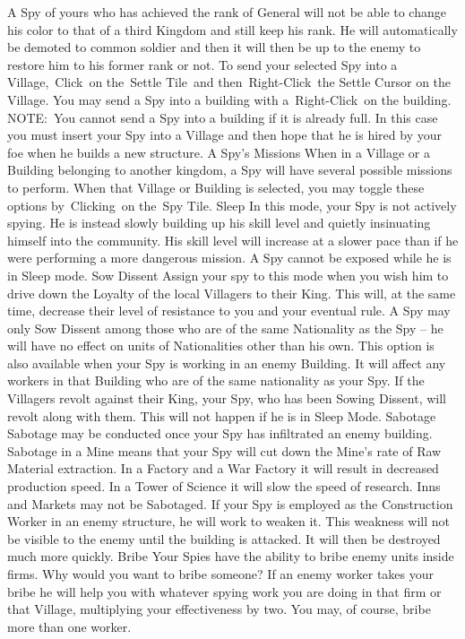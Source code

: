 A Spy of yours who has achieved the rank of General will not be able to change his color to that of a third Kingdom and still keep his rank. He will automatically be demoted to common soldier and then it will then be up to the enemy to restore him to his former rank or not.
To send your selected Spy into a Village, Click on the Settle Tile and then Right-Click the Settle Cursor on the Village.
You may send a Spy into a building with a Right-Click on the building.
NOTE: You cannot send a Spy into a building if it is already full. In this case you must insert your Spy into a Village and then hope that he is hired by your foe when he builds a new structure.
A Spy’s Missions
When in a Village or a Building belonging to another kingdom, a Spy will have several possible missions to perform. When that Village or Building is selected, you may toggle these options by Clicking on the Spy Tile.
Sleep
In this mode, your Spy is not actively spying. He is instead slowly building up his skill level and quietly insinuating himself into the community. His skill level will increase at a slower pace than if he were performing a more dangerous mission. A Spy cannot be exposed while he is in Sleep mode.
Sow Dissent
Assign your spy to this mode when you wish him to drive down the Loyalty of the local Villagers to their King. This will, at the same time, decrease their level of resistance to you and your eventual rule. A Spy may only Sow Dissent among those who are of the same Nationality as the Spy -- he will have no effect on units of Nationalities other than his own.
This option is also available when your Spy is working in an enemy Building. It will affect any workers in that Building who are of the same nationality as your Spy.
If the Villagers revolt against their King, your Spy, who has been Sowing Dissent, will revolt along with them. This will not happen if he is in Sleep Mode.
Sabotage
Sabotage may be conducted once your Spy has infiltrated an enemy building.
Sabotage in a Mine means that your Spy will cut down the Mine’s rate of Raw Material extraction.
In a Factory and a War Factory it will result in decreased production speed.
In a Tower of Science it will slow the speed of research.
Inns and Markets may not be Sabotaged.
If your Spy is employed as the Construction Worker in an enemy structure, he will work to weaken it. This weakness will not be visible to the enemy until the building is attacked. It will then be destroyed much more quickly.
Bribe
Your Spies have the ability to bribe enemy units inside firms.
Why would you want to bribe someone?
If an enemy worker takes your bribe he will help you with whatever spying work you are doing in that firm or that Village, multiplying your effectiveness by two. You may, of course, bribe more than one worker.
